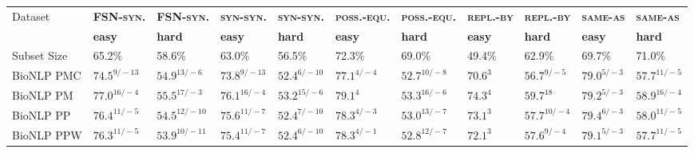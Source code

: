 \documentclass[letterpaper]{article} %
\newcommand{\dataset}[1]{\textsc{#1}}
\begin{document}
\begin{table*}[ht]
    \centering
\scriptsize	
     \begin{tabular}{l l l l l l l l l l l}
\multirow{2}{*}{Dataset}& \textbf{\dataset{FSN-syn.}} & \textbf{\dataset{FSN-syn.}} & \textbf{\dataset{syn-syn.}} & \textbf{\dataset{syn-syn.}} & \textbf{\dataset{poss.-equ.}} & \textbf{\dataset{poss.-equ.}} & \textbf{\dataset{repl.-by}} & \textbf{\dataset{repl.-by}} & \textbf{\dataset{same-as}} & \textbf{\dataset{same-as}} \\
& \textbf{easy} & \textbf{hard} & \textbf{easy} & \textbf{hard} & \textbf{easy} & \textbf{hard} & \textbf{easy} & \textbf{hard} & \textbf{easy} & \textbf{hard} \\ 
Subset Size & 65.2\% & 58.6\% & 63.0\% & 56.5\% & 72.3\% & 69.0\% & 49.4\% & 62.9\% & 69.7\% & 71.0\% \\
\midrule
BioNLP PMC & $74.5^{9/-13}$ & $54.9^{13/-6}$ & $73.8^{9/-13}$ & $52.4^{6/-10}$ & $77.1^{4/-4}$ & $52.7^{10/-8}$ & $70.6^{3}$ & $56.7^{9/-5}$ & $79.0^{5/-3}$ & $57.7^{11/-5}$ \\
BioNLP PM & $77.0^{16/-4}$ & $55.5^{17/-3}$ & $76.1^{16/-4}$ & $53.2^{15/-6}$ & $79.1^{4}$ & $53.3^{16/-6}$ & $74.3^{4}$ & $59.7^{18}$ & $79.2^{5/-3}$ & $58.9^{16/-4}$ \\
BioNLP PP & $76.4^{11/-5}$ & $54.5^{12/-10}$ & $75.6^{11/-7}$ & $52.4^{7/-10}$ & $78.3^{4/-3}$ & $53.0^{13/-7}$ & $73.1^{3}$ & $57.7^{10/-4}$ & $79.4^{6/-3}$ & $58.0^{11/-5}$ \\
BioNLP PPW & $76.3^{11/-5}$ & $53.9^{10/-11}$ & $75.4^{11/-7}$ & $52.4^{6/-10}$ & $78.3^{4/-1}$ & $52.8^{12/-7}$ & $72.1^{3}$ & $57.6^{9/-4}$ & $79.1^{5/-3}$ & $57.7^{11/-5}$ \\

\end{tabular}
\end{table*}
\end{document}

